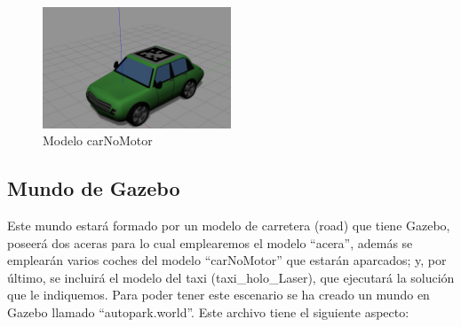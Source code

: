 \begin{figure}[H]
  \begin{center}
    \includegraphics[width=0.5\textwidth]{figures/Autopark/carNoMotor.png}
		\caption{Modelo carNoMotor}
		\label{fig.carNoMotor}
		\end{center}
\end{figure}

\subsection{Mundo de Gazebo}
Este mundo estará formado por un modelo de carretera (road) que tiene Gazebo, poseerá dos aceras para lo cual emplearemos el modelo ``acera'', además se emplearán varios coches del modelo ``carNoMotor'' que estarán aparcados; y, por último, se incluirá el modelo del taxi (taxi\_holo\_Laser), que ejecutará la solución que le indiquemos. Para poder tener este escenario se ha creado un mundo en Gazebo llamado ``autopark.world''. Este archivo tiene el siguiente aspecto:

